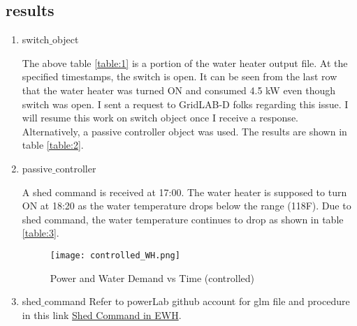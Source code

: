 \subsection{results}
    \begin{enumerate}
        \item switch$\_$object

        The above table \ref{table:1} is a portion of the water heater output file. At the specified timestamps, the switch is open. It can be seen from the last row that the water heater was turned ON and consumed 4.5 kW even though switch was open. I sent a request to GridLAB-D folks regarding this issue. I will resume this work on switch object once I receive a response. Alternatively, a passive controller object was used. The results are shown in table \ref{table:2}.
    
        \item passive$\_$controller
        
        A shed command is received at 17:00. The water heater is supposed to turn ON at 18:20 as the water temperature drops below the range (118F). Due to shed command, the water temperature continues to drop as shown in table \ref{table:3}.
        \begin{figure}[hbt!]
            \texttt{[image: controlled\_WH.png]}
            \caption{Power and Water Demand vs Time (controlled)}
            \label{fig:controlled_wh}
        \end{figure}
        \newpage
        \item shed$\_$command
        Refer to powerLab github account for glm file and procedure in this link \href{https://github.com/MidrarAdham/GridLab-D/tree/master/NeoChargeProject/WH_4_Node_feeder/WH_shed_command}{Shed Command in EWH}.
        
    \end{enumerate}
    \newpage
